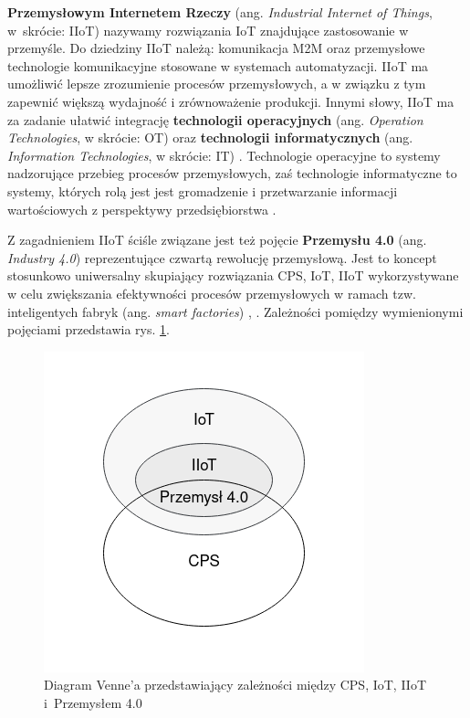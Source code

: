\documentclass[a4paper, 12pt, twoside]{article}
\begin{document}
\textbf{Przemysłowym Internetem Rzeczy} (ang. \emph{Industrial Internet of Things}, w~skrócie: IIoT)
nazywamy rozwiązania IoT znajdujące zastosowanie w przemyśle. Do dziedziny
IIoT należą: komunikacja M2M oraz przemysłowe technologie komunikacyjne stosowane 
w systemach automatyzacji. IIoT ma umożliwić lepsze zrozumienie procesów
przemysłowych, a w związku z tym zapewnić większą wydajność i zrównoważenie
produkcji. Innymi słowy, IIoT ma za zadanie ułatwić integrację \textbf{technologii operacyjnych} 
(ang. \emph{Operation Technologies}, w skrócie: OT) oraz
\textbf{technologii informatycznych} (ang. \emph{Information Technologies}, w skrócie: IT) 
\cite{iiot-challenges-opportunities-directions}.
Technologie operacyjne to systemy nadzorujące przebieg procesów przemysłowych, 
zaś technologie informatyczne to systemy, których rolą jest jest gromadzenie 
i przetwarzanie informacji wartościowych z perspektywy przedsiębiorstwa
\cite{ot-it-categorization-of-customer-concerns}.

Z zagadnieniem IIoT ściśle związane jest też pojęcie \textbf{Przemysłu 4.0} (ang. \emph{Industry 4.0})
reprezentujące czwartą rewolucję przemysłową. Jest to koncept stosunkowo uniwersalny
skupiający rozwiązania CPS, IoT, IIoT wykorzystywane w celu zwiększania efektywności
procesów przemysłowych w ramach tzw. inteligentych fabryk (ang. \emph{smart factories})
\cite{iiot-cyber-manufacturing-systems}, \cite{iiot-challenges-opportunities-directions}.
Zależności pomiędzy wymienionymi pojęciami przedstawia rys. \ref{fig:venn}.

\begin{figure}[h]
    \centering
    \includegraphics[scale=0.55]{Venn.png}
    \caption{Diagram Venne'a przedstawiający zależności między CPS, IoT, IIoT i~Przemysłem 4.0}
    \label{fig:venn}
\end{figure}
\end{document}
